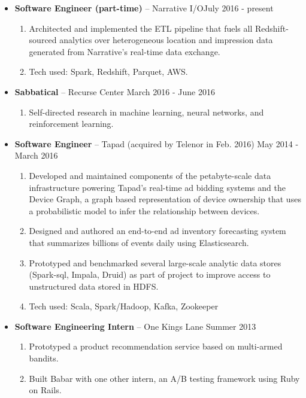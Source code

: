 \documentclass[11pt]{article}
\begin{document}
\begin{itemize}[leftmargin=12pt]
  \item[] \textbf{Software Engineer (part-time)} -- Narrative I/O\hfill July 2016 - present
    \begin{enumerate}[leftmargin=2em,labelindent=16pt,label=$\bullet$]
      \item Architected and implemented the ETL pipeline that fuels all Redshift-sourced analytics over heterogeneous location and impression data generated from Narrative's real-time data exchange.
      \item Tech used: Spark, Redshift, Parquet, AWS.
    \end{enumerate}
  \item[] \textbf{Sabbatical} -- Recurse Center \hfill March 2016 - June 2016
    \begin{enumerate}[leftmargin=2em,labelindent=16pt,label=$\bullet$]
      \item Self-directed research in machine learning, neural networks, and reinforcement learning.
    \end{enumerate}
  \item[] \textbf{Software Engineer} -- Tapad (acquired by Telenor in Feb. 2016) \hfill May 2014 - March 2016 
    \begin{enumerate}[leftmargin=2em,labelindent=16pt,label=$\bullet$]
      \item Developed and maintained components of the petabyte-scale data infrastructure powering Tapad's real-time ad bidding systems and the Device Graph, a graph based representation of device ownership that uses a probabilistic model to infer the relationship between devices. 
      \item Designed and authored an end-to-end ad inventory forecasting system that summarizes billions of events daily using Elasticsearch.
      \item Prototyped and benchmarked several large-scale analytic data stores (Spark-sql, Impala, Druid) as part of project to improve access to unstructured data stored in HDFS. 
      \item Tech used: Scala, Spark/Hadoop, Kafka, Zookeeper
    \end{enumerate}
  \item[] \textbf{Software Engineering Intern} -- One Kings Lane \hfill Summer 2013 
    \begin{enumerate}[leftmargin=2em,labelindent=16pt,label=$\bullet$]
      \item Prototyped a product recommendation service based on multi-armed bandits.
      \item Built Babar with one other intern, an A/B testing framework using Ruby on Rails.
    \end{enumerate}


\end{itemize}
\end{document}
